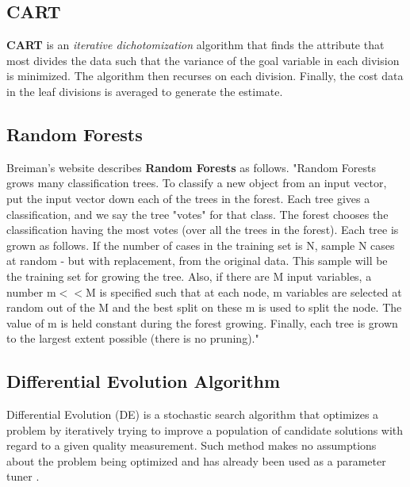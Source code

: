 \documentclass{sig-alternative}
\begin{document}
\subsection{CART}
\textbf{CART} is an {\em iterative dichotomization} algorithm
that finds the attribute that most divides the data such that
the variance of the goal variable in each division is
minimized\cite{breiman84}.
The algorithm then recurses on each division.
Finally, the cost data in the leaf divisions
is averaged to generate the estimate.

\subsection{Random Forests}

Breiman's website describes \textbf{Random Forests} as
follows\cite{brieman00}. "Random Forests grows many classification
trees. To classify a new object from an input vector, put the input
vector down each of the trees in the forest. Each tree gives a
classification, and we say the tree "votes" for that class. The forest
chooses the classification having the most votes (over all the trees
in the forest). Each tree is grown as follows.
If the number of cases in the training set is N, sample N cases at
random - but with replacement, from the original data. This sample
will be the training set for growing the tree.
Also, if there are M input variables, a number m$<<$M is specified such
that at each node, m variables are selected at random out of the M and
the best split on these m is used to split the node. The value of m is
held constant during the forest growing.
Finally, each tree is grown to the largest extent possible (there is
no pruning)."




%




\subsection{Differential Evolution Algorithm}
Differential Evolution (DE)\cite{storn1997differential} is a stochastic search algorithm that 
optimizes a problem by iteratively trying to improve a  population of candidate solutions with 
regard to a given quality measurement. Such method makes no assumptions about the 
problem being optimized and has already been used as a parameter tuner
\cite{omran2005differential, chiha2012tuning}.
\end{document}
